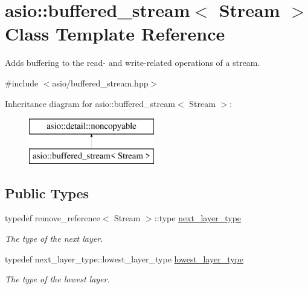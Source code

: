 \hypertarget{classasio_1_1buffered__stream}{}\section{asio\+:\+:buffered\+\_\+stream$<$ Stream $>$ Class Template Reference}
\label{classasio_1_1buffered__stream}


Adds buffering to the read-\/ and write-\/related operations of a stream.  




{\ttfamily \#include $<$asio/buffered\+\_\+stream.\+hpp$>$}

Inheritance diagram for asio\+:\+:buffered\+\_\+stream$<$ Stream $>$\+:\begin{figure}[H]
\begin{center}
\leavevmode
\includegraphics[height=2.000000cm]{classasio_1_1buffered__stream}
\end{center}
\end{figure}
\subsection*{Public Types}
\begin{DoxyCompactItemize}
\item 
typedef remove\+\_\+reference$<$ Stream $>$\+::type \hyperlink{classasio_1_1buffered__stream_acde0aacfaa4ec31697fe87ae83704af1}{next\+\_\+layer\+\_\+type}
\begin{DoxyCompactList}\small\item\em The type of the next layer. \end{DoxyCompactList}\item 
typedef next\+\_\+layer\+\_\+type\+::lowest\+\_\+layer\+\_\+type \hyperlink{classasio_1_1buffered__stream_aed77dcc210c8f8bc905715340a498bc2}{lowest\+\_\+layer\+\_\+type}
\begin{DoxyCompactList}\small\item\em The type of the lowest layer. \end{DoxyCompactList}\end{DoxyCompactItemize}
